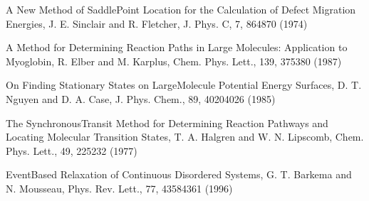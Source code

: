 \documentclass[letterpaper,11pt,english]{sphinxmanual}
\begin{document}
\sphinxAtStartPar
A New Method of Saddle\sphinxhyphen{}Point Location for the Calculation of Defect Migration Energies, J. E. Sinclair and R. Fletcher, J. Phys. C, 7, 864\sphinxhyphen{}870 (1974)

\sphinxAtStartPar
A Method for Determining Reaction Paths in Large Molecules:  Application to Myoglobin, R. Elber and M. Karplus, Chem. Phys. Lett., 139, 375\sphinxhyphen{}380 (1987)

\sphinxAtStartPar
On Finding Stationary States on Large\sphinxhyphen{}Molecule Potential Energy Surfaces, D. T. Nguyen and D. A. Case, J. Phys. Chem., 89, 4020\sphinxhyphen{}4026 (1985)

\sphinxAtStartPar
The Synchronous\sphinxhyphen{}Transit Method for Determining Reaction Pathways and Locating Molecular Transition States, T. A. Halgren and W. N. Lipscomb, Chem. Phys. Lett., 49, 225\sphinxhyphen{}232 (1977)

\sphinxAtStartPar
Event\sphinxhyphen{}Based Relaxation of Continuous Disordered Systems, G. T. Barkema and N. Mousseau, Phys. Rev. Lett., 77, 4358\sphinxhyphen{}4361 (1996)



\renewcommand{\indexname}{Index}
\printindex
\end{document}
